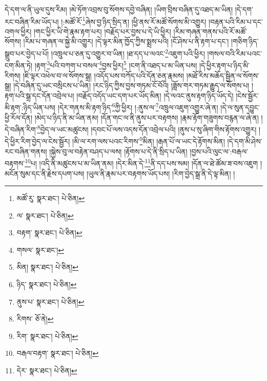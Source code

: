 དེ་དག་ལ་ནི་ཡུལ་དུས་རིམ། །མེ་ཏོག་འབྲས་བུ་སོགས་དབྱེ་བཞིན། །ཡིག་བྲིས་བཞིན་དུ་འཐད་མ་ཡིན། །དེ་དག་རང་བཞིན་རིམ་ཡོད་པ། །:མཚོ་རོ་\footnote{མཚོ་རུ་  སྣར་ཐང་།  པེ་ཅིན། }ཞེས་བྱ་ཉིད་སྲིད་ན། །ཕྱི་ནས་རོ་མཚོ་སོགས་མི་འགྱུར། །བརྟན་པའི་རིམ་པ་དང་འགལ་ཕྱིར། །གང་ཕྱིར་ཡི་གེ་རྣམ་རྟག་པར། །བརྗོད་པར་བྱས་པ་དེ་ཡི་ཕྱིར། །རིམ་གཞན་གནས་པའི་རོ་མཚོ་སོགས། །རིམ་པ་གཞན་ལ་སྐྱེ་མི་འགྱུར། །དེ་ལྟར་མིན་ཁྱོད་ཀྱིས་སྨྲས་པའི། །ངོ་ཤེས་པ་ནི་རྟག་པ་དང་། །གཅིག་ཉིད་སྒྲུབ་པར་བྱེད་པ་པོ། །འཁྲུལ་པ་ཅན་དུ་འགྱུར་བ་ཡིན། །ཐ་དད་པ་ལའང་\footnote{ལ་  སྣར་ཐང་།  པེ་ཅིན། }འཇུག་པའི་ཕྱིར། །གསལ་བའི་རིམ་པའང་ངག་མིན་ཏེ། །རྟག་\footnote{བརྟག་  སྣར་ཐང་།  པེ་ཅིན། }པའི་བཀག་པ་བསལ་\footnote{གསལ་  སྣར་ཐང་། }བྱས་ཕྱིར།\footnote{མིན།  སྣར་ཐང་།  པེ་ཅིན། } །ངག་ནི་འཐད་པ་མ་ཡིན་པས། །དེ་ཕྱིར་རྟག་པ་ཉིད་མི་རིགས། །ཇི་ལྟར་འཕེལ་བ་ལ་སོགས་སྒྲ། །འདོད་པས་བཀོད་པའི་དོན་ཅན་རྣམས། །མཐོ་རིས་མཆོད་སྦྱིན་ལ་སོགས་སྒྲ། །དེ་བཞིན་དུ་ཡང་བསྲིངས་པ་ཡིན། །རང་ཉིད་ཀྱིས་བྱས་གཏམ་ངོ་བོའི། །ཟློས་གར་གཏམ་རྒྱུད་ལ་སོགས་པ། །རྟག་པའི་སྒྲ་དང་དོན་འབྲེལ་པ། །བརྗོད་འདོད་ཡང་དག་པར་ཡོད་མིན། །དེ་ལའང་ནུས་རྟག་ཉིད་ཡོད་དེ། །ངེས་སྦྱོར་མི་རྟག་:ཉིད་ཡིན་པས། །དེར་གནས་མི་རྟག་ཉིད་\footnote{ཉིད་  སྣར་ཐང་།  པེ་ཅིན། }ཀྱི་ཕྱིར། །:ནུས་ལ་\footnote{ནུས་པ་  སྣར་ཐང་།  པེ་ཅིན། }འཁྲུལ་འཇུག་འགྱུར་ཞེ་ན། །དེ་ལ་སུན་དབྱུང་ཕྱི་རོལ་དོན། །མེད་པ་ཉིད་ནི་མ་ཡིན་ནམ། །དོན་གང་ལ་ནི་ནུས་པར་བརྟགས། །རྣམ་རྟོག་གཟུགས་བརྙན་ལ་ཞེ་ན། །དེ་བཞིན་རིག་\footnote{རིགས་  ཅོ་ནེ། }བྱེད་ལ་ཡང་མཚུངས། །དབང་པོ་ལས་འདས་དོན་འབྲེལ་པའི། །ནུས་པ་སུ་ཞིག་གིས་རྟོགས་འགྱུར། །དེ་ཕྱིར་རིག་བྱེད་ལ་ངེས་སྦྱོར། །མི་ལ་རག་ལས་པའང་རིགས་\footnote{རིག་  སྣར་ཐང་།  པེ་ཅིན། }མིན། །རྒན་པོ་ལ་ཡང་དེ་རྟོགས་མིན། །དེ་དག་མི་ཤེས་རང་བཞིན་གནས། །སྐྱེས་བུ་ལ་བརྟེན་བཤད་པ་ལས། །རྟོགས་པ་དེ་ནི་སྲིད་པ་ཡིན། །བྱས་པའི་ལུང་ལ་:བརྒལ་བརྟགས་\footnote{བརྒལ་བརྟག་  སྣར་ཐང་།  པེ་ཅིན། }པ། །འདི་ནི་མཚུངས་པ་མ་ཡིན་ནམ། །དེར་མིན་དེ་\footnote{དེར་  སྣར་ཐང་།  པེ་ཅིན། }ནི་དད་པས་སམ། །དོན་ལ་ཐེ་ཚོམ་ཟ་བས་འཇུག །མངོན་སུམ་དང་ནི་རྗེས་དཔག་པས། །ཡུལ་ནི་རྣམ་པར་བརྟགས་ཡོད་པས། །རིག་བྱེད་སྒྲ་ནི་དེ་ལྟ་མིན། །
